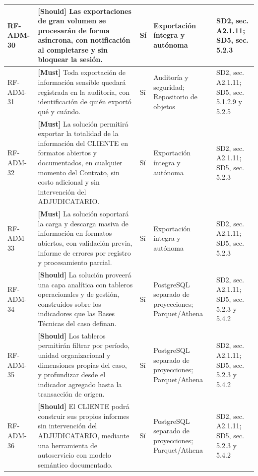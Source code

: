 \begin{paginaHorizontalSynaptix}
\begin{longtable}{|L{0.09\AnchoMatrizTDoce}|L{0.385\AnchoMatrizTDoce}|L{0.065\AnchoMatrizTDoce}|L{0.18\AnchoMatrizTDoce}|L{0.28\AnchoMatrizTDoce}|}
RF-\allowbreak{}ADM-\allowbreak{}30 &
\textbf{[Should]} Las exportaciones de gran volumen se procesarán de forma asíncrona, con notificación al completarse y sin bloquear la sesión. &
Sí &
Exportación íntegra y autónoma &
SD2, sec. A2.1.11; SD5, sec. 5.2.3 \\ \hline

RF-\allowbreak{}ADM-\allowbreak{}31 &
\textbf{[Must]} Toda exportación de información sensible quedará registrada en la auditoría, con identificación de quién exportó qué y cuándo. &
Sí &
Auditoría y seguridad; Repositorio de objetos &
SD2, sec. A2.1.11; SD5, sec. 5.1.2.9 y 5.2.5 \\ \hline

RF-\allowbreak{}ADM-\allowbreak{}32 &
\textbf{[Must]} La solución permitirá exportar la totalidad de la información del CLIENTE en formatos abiertos y documentados, en cualquier momento del Contrato, sin costo adicional y sin intervención del ADJUDICATARIO. &
Sí &
Exportación íntegra y autónoma &
SD2, sec. A2.1.11; SD5, sec. 5.2.3 \\ \hline

RF-\allowbreak{}ADM-\allowbreak{}33 &
\textbf{[Must]} La solución soportará la carga y descarga masiva de información en formatos abiertos, con validación previa, informe de errores por registro y procesamiento parcial. &
Sí &
Exportación íntegra y autónoma &
SD2, sec. A2.1.11; SD5, sec. 5.2.3 \\ \hline

RF-\allowbreak{}ADM-\allowbreak{}34 &
\textbf{[Should]} La solución proveerá una capa analítica con tableros operacionales y de gestión, construidos sobre los indicadores que las Bases Técnicas del caso definan. &
Sí &
PostgreSQL separado de proyecciones; Parquet/Athena &
SD2, sec. A2.1.11; SD5, sec. 5.2.3 y 5.4.2 \\ \hline

RF-\allowbreak{}ADM-\allowbreak{}35 &
\textbf{[Should]} Los tableros permitirán filtrar por período, unidad organizacional y dimensiones propias del caso, y profundizar desde el indicador agregado hasta la transacción de origen. &
Sí &
PostgreSQL separado de proyecciones; Parquet/Athena &
SD2, sec. A2.1.11; SD5, sec. 5.2.3 y 5.4.2 \\ \hline

RF-\allowbreak{}ADM-\allowbreak{}36 &
\textbf{[Should]} El CLIENTE podrá construir sus propios informes sin intervención del ADJUDICATARIO, mediante una herramienta de autoservicio con modelo semántico documentado. &
Sí &
PostgreSQL separado de proyecciones; Parquet/Athena &
SD2, sec. A2.1.11; SD5, sec. 5.2.3 y 5.4.2 \\ \hline


\end{longtable}
\end{paginaHorizontalSynaptix}
